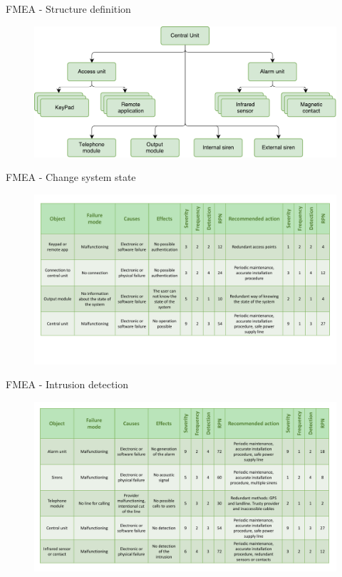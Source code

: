 \begin{frame}{FMEA - Structure definition}

    \begin{figure}[ht!]
      \includegraphics[width=120mm]{images/fmea_structure_definition.pdf}
      \label{fig:fmea_structure_definition}
    \end{figure}
\end{frame}

\begin{frame}{FMEA - Change system state}

    \begin{figure}[ht!]
      \includegraphics[width=120mm]{images/fmea_change_state.pdf}
      \label{fig:fmea_change_state}
    \end{figure}
\end{frame}

\begin{frame}{FMEA - Intrusion detection}
      \vskip 1.0cm
    \begin{figure}[ht!]
      \includegraphics[width=120mm]{images/fmea_intrusion_detection.pdf}
      \label{fig:fmea_intrusion_detection}
    \end{figure}
\end{frame}

